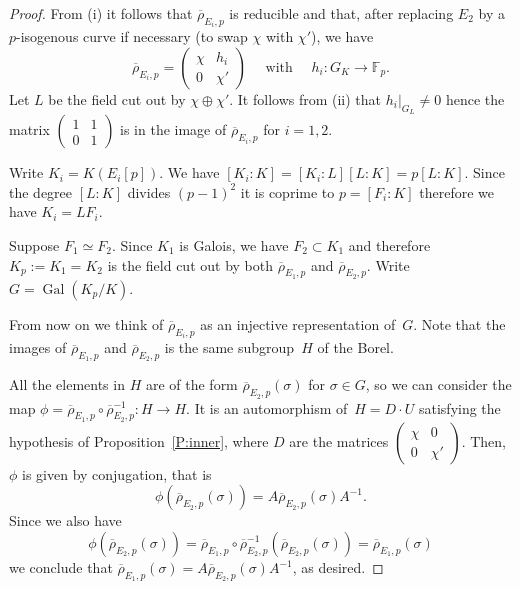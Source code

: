 \documentclass[12pt]{amsart}
\newcommand{\F}{\mathbb{F}}
\newcommand{\rhobar}{{\overline{\rho}}}
\DeclareMathOperator{\Gal}{Gal}
\numberwithin{equation}{section}
\theoremstyle{definition}
\theoremstyle{remark}
\begin{document}
\begin{proof} From (i) it follows that $\rhobar_{E_i,p}$ is reducible and that, after replacing $E_2$ by a $p$-isogenous curve if necessary (to swap 
$\chi$ with $\chi'$), 
we have 
\[
\rhobar_{E_i,p} =  \begin{pmatrix}
                            \chi & h_i \\
                            0 & \chi'
                            \end{pmatrix} \quad \text{ with } \quad  h_i : G_K \to \F_p.  
\]
Let $L$ be the field cut out 
by $\chi \oplus \chi'$. 
It follows from (ii) that $h_i|_{G_L} \neq 0$ 
hence the matrix $\left(\begin{smallmatrix}
                            1 & 1 \\
                            0 & 1
                            \end{smallmatrix} \right)$  
is in the image of $\rhobar_{E_i,p}$ for $i=1,2$.
                            
Write $K_i = K(E_i[p])$. 
We have $[K_i : K] = [K_i : L][L : K] = p [L : K]$. 
Since the degree $[L : K]$ divides $(p-1)^2$ it is coprime 
to $p = [F_i : K]$ therefore we have $K_i = L F_i$.

Suppose $F_1 \simeq F_2$. Since $K_1$ is Galois, we have $F_2 \subset K_1$ and therefore $K_p := K_1 = K_2$ is the field cut out by both
$\rhobar_{E_1,p}$ and $\rhobar_{E_2,p}$.
Write $G = \Gal(K_p / K)$. 

From now on we think of $\rhobar_{E_i,p}$ as an injective representation of~$G$. Note that the images of $\rhobar_{E_1,p}$ and $\rhobar_{E_2,p}$
is the same subgroup~$H$ of the Borel.

All the elements in $H$ are of the form $\rhobar_{E_2,p}(\sigma)$ for $\sigma \in G$, so we can consider the map $\phi = \rhobar_{E_1,p} \circ \rhobar_{E_2,p}^{-1} : H \to H$. It is an automorphism of~$H = D\cdot U$ satisfying the hypothesis of Proposition~\ref{P:inner}, where $D$ are 
the matrices $\left(\begin{smallmatrix}
                            \chi & 0 \\
                            0 & \chi'
                            \end{smallmatrix} \right)$.  
Then, $\phi$ is given by conjugation, that is
\[
 \phi(\rhobar_{E_2,p}(\sigma)) = A \rhobar_{E_2,p}(\sigma) A^{-1}.
\]
Since we also have
\[ 
\phi(\rhobar_{E_2,p}(\sigma)) 
=  \rhobar_{E_1,p} \circ \rhobar_{E_2,p}^{-1}(\rhobar_{E_2,p}(\sigma)) = \rhobar_{E_1,p}(\sigma)
\]
we conclude that $\rhobar_{E_1,p}(\sigma) = A \rhobar_{E_2,p}(\sigma) A^{-1}$, as desired.
\end{proof}
\end{document}
